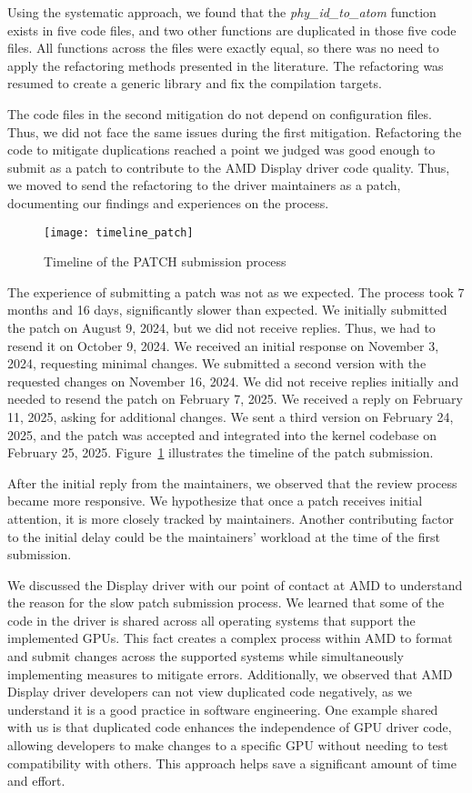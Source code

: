 Using the systematic approach, we found that the \textit{phy\_id\_to\_atom} function 
exists in five code files, and two other functions are duplicated
in those five code files. All functions across the files were exactly equal,
so there was no need to apply the refactoring methods presented in the literature.
The refactoring was resumed to create a generic library and fix the compilation targets.

The code files in the second mitigation do not depend on configuration files. Thus,
we did not face the same issues during the first mitigation. Refactoring the code
to mitigate duplications reached a point we judged was good enough to submit as a
patch to contribute to the AMD Display driver code quality. Thus, we moved to send
the refactoring to the driver maintainers as a patch, documenting our findings and experiences
on the process.

\begin{figure}
\texttt{[image: timeline\_patch]}
\caption{Timeline of the PATCH submission process}
\label{fig:timeline}
\end{figure}

The experience of submitting a patch was not as we expected. The process took 7 
months and 16 days, significantly slower than expected. We initially submitted 
the patch on August 9, 2024, but we did not receive replies. Thus, we had to 
resend it on October 9, 2024. We received an initial response on November 3, 2024, 
requesting minimal changes. We submitted a second version with the requested 
changes on November 16, 2024. We did not receive replies initially and needed
to resend the patch on February 7, 2025. We received a reply on 
February 11, 2025, asking for additional changes. We sent a third version on 
February 24, 2025, and the patch was accepted and integrated into the kernel 
codebase on February 25, 2025. Figure~\ref{fig:timeline} illustrates the 
timeline of the patch submission.

After the initial reply from the maintainers, we observed that the review process 
became more responsive. We hypothesize that once a patch receives initial attention, 
it is more closely tracked by maintainers. Another contributing factor to the initial 
delay could be the maintainers' workload at the time of the first submission.

We discussed the Display driver with our point of contact at AMD to understand the 
reason for the slow patch submission process. We learned that some of the code in 
the driver is shared across all operating systems that support the implemented GPUs. 
This fact creates a complex process within AMD to format and submit changes across 
the supported systems while simultaneously implementing measures to mitigate errors. 
Additionally, we observed that AMD Display driver developers can not view 
duplicated code negatively, as we understand it is a good practice in software engineering. 
One example shared with us is that duplicated code enhances the independence of 
GPU driver code, allowing developers to make changes to a specific GPU without 
needing to test compatibility with others. This approach helps save a 
significant amount of time and effort.

